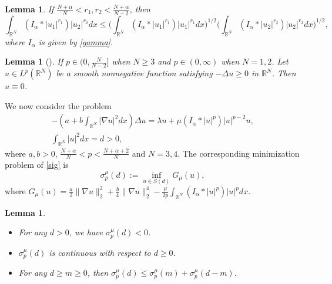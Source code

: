 \documentclass[10pt,a4paper]{amsart}
\numberwithin{equation}{section}
\newtheorem{lemma}[theo]{Lemma}
\begin{document}
\begin{lemma}\label{qxz3}
If $\frac{N+\alpha}{N}<r_1,r_2<\frac{N+\alpha}{N-2}$, then
\[
\int_{\mathbb{R}^N}(I_\alpha\ast|u_1|^{r_1})|u_2|^{r_2}dx
\leq\Big(\int_{\mathbb{R}^N}(I_\alpha\ast|u_1|^{r_1})|u_1|^{r_1}dx\Big)^{1/2}
\Big(\int_{\mathbb{R}^N}(I_\alpha\ast|u_2|^{r_2})|u_2|^{r_2}dx\Big)^{1/2},
\]
where $I_\alpha$ is given by \eqref{gamma}.
\end{lemma}


\begin{lemma}[{\cite[Lemma A.2]{em}}] \label{Liuv}
If $p\in(0,\frac{N}{N-2}]$ when $N\geq3$ and $p\in(0,\infty)$ when $N=1,2$. 
Let $u\in L^p(\mathbb{R}^N)$ be a smooth nonnegative function
satisfying $-\Delta u\geq0$ in $\mathbb{R}^N$. Then $u\equiv0$.
\end{lemma}

We now consider the problem
\begin{equation}\label{sig}
\begin{gathered}
-(a+b\int_{\mathbb{R}^N}|\nabla u|^2dx)\Delta u
=\lambda u+\mu(I_\alpha\ast|u|^p)|u|^{p-2}u,\\
\int_{\mathbb{R}^N}|u|^2dx=d>0,
\end{gathered}
\end{equation}
where $a,b>0$, $\frac{N+\alpha}{N}<p<\frac{N+\alpha+2}{N}$ and $N=3,4$. 
The corresponding minimization problem of \eqref{sig} is
\begin{equation}\label{ehs}
\sigma_p^{\mu}(d):=\inf_{u\in S(d)} G_\mu(u),
\end{equation}
where $G_\mu(u)=\frac{a}{2}\| \nabla u\|_2^2+\frac{b}{4}\| \nabla u\|_2^4
-\frac{\mu}{2p} \int_{\mathbb{R}^N}(I_\alpha\ast|u|^p)|u|^pdx$.

\begin{lemma}\label{byg}
\begin{itemize}
\item[(i)]   For any $d>0$, we have $\sigma_p^{\mu}(d)<0$.
\item[(ii)] $\sigma_p^{\mu}(d)$ is continuous with respect to $d\geq0$.
\item[(iii)] For any $d\geq m\geq0$, then 
$\sigma_p^{\mu}(d)\leq\sigma_p^{\mu}(m)+\sigma_p^{\mu}(d-m)$.
\end{itemize}
\end{lemma}
\end{document}
